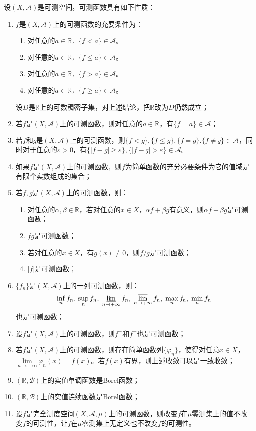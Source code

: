 \begin{property}\label{prop:MeasurableFunction}
	设$(X,\mathscr{A})$是可测空间。可测函数具有如下性质：
	\begin{enumerate}
		\item $f$是$(X,\mathscr{A})$上的可测函数的充要条件为：
		\begin{enumerate}
			\item 对任意的$a\in\mathbb{R}$，$\{f<a\}\in\mathscr{A}$。
			\item 对任意的$a\in\mathbb{R}$，$\{f\leqslant a\}\in\mathscr{A}$。
			\item 对任意的$a\in\mathbb{R}$，$\{f>a\}\in\mathscr{A}$。
			\item 对任意的$a\in\mathbb{R}$，$\{f\geqslant a\}\in\mathscr{A}$。
		\end{enumerate}
		设$D$是$\mathbb{R}$上的可数稠密子集，对上述结论，把$\mathbb{R}$改为$D$仍然成立；
		\item 若$f$是$(X,\mathscr{A})$上的可测函数，则对任意的$a\in\overline{\mathbb{R}^{}}$，有$\{f=a\}\in\mathscr{A}$；
		\item 若$f$和$g$是$(X,\mathscr{A})$上的可测函数，则$\{f<g\},\{f\leqslant g\},\{f=g\}.\{f\ne g\}\in\mathscr{A}$，同时对于任意的$\varepsilon>0$，有$\{|f-g|\geqslant\varepsilon\},\{|f-g|>\varepsilon\}\in \mathscr{A}$。
		\item 如果$f$是$(X,\mathscr{A})$上的可测函数，则$f$为简单函数的充分必要条件为它的值域是有限个实数组成的集合；
		\item 若$f,g$是$(X,\mathscr{A})$上的可测函数，则：
		\begin{enumerate}
			\item 对任意的$\alpha,\beta\in\overline{\mathbb{R}}$，若对任意的$x\in X$，$\alpha f+\beta g$有意义，则$\alpha f+\beta g$是可测函数；
			\item $fg$是可测函数；
			\item 若对任意的$x\in X$，有$g(x)\ne0$，则$f/g$是可测函数；
			\item $|f|$是可测函数；
		\end{enumerate}
		\item $\{f_n\}$是$(X,\mathscr{A})$上的一列可测函数，则：
		\begin{equation*}
			\inf_nf_n,\;\sup_nf_n,\;
			\varliminf_{n\to+\infty}f_n,\;\varlimsup_{n\to+\infty}f_n,\;\max_nf_n,\;\min_nf_n
		\end{equation*}
		也是可测函数；
		\item 设$f$是$(X,\mathscr{A})$上的可测函数，则$f^+$和$f^-$也是可测函数；
		\item 若$f$是$(X,\mathscr{A})$上的可测函数，则存在简单函数列$\{\varphi_n\}$，使得对任意$x\in X$，$\lim\limits_{n\to+\infty}\varphi_n(x)=f(x)$。若$f(x)$有界，则上述收敛可以是一致收敛；
		\item $(\mathbb{R},\mathcal{B})$上的实值单调函数是Borel函数；
		\item $(\mathbb{R},\mathcal{B})$上的实值连续函数是Borel函数；
		\item 设$f$是完全测度空间$(X,\mathscr{A},\mu)$上的可测函数，则改变$f$在$\mu$零测集上的值不改变$f$的可测性，让$f$在$\mu$零测集上无定义也不改变$f$的可测性。
	\end{enumerate}
\end{property}
